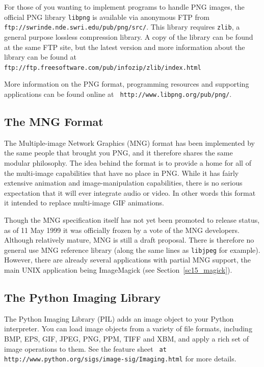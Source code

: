 \documentclass[twoside,11pt]{article}
\newcommand{\htmladdnormallink}[2]{#1}
\newcommand{\htmlref}[2]{#1}
\newcommand{\latex}[1]{#1}
\newcommand{\xlabel}[1]{}
\begin{document}
For those of you wanting to implement programs to handle PNG images,
the official PNG library {\tt libpng} is available via anonymous FTP
from \htmladdnormallink{{\tt
ftp://swrinde.nde.swri.edu/pub/png/src/}}{ftp://swrinde.nde.swri.edu/pub/png/src/}.
This library requires {\tt zlib}, a general purpose lossless
compression library. A copy of the library can be found at the same
FTP site, but the latest version and more information about the
library can be found at \htmladdnormallink{{\tt
ftp://ftp.freesoftware.com/pub/infozip/zlib/index.html}}{ftp://ftp.freesoftware.com/pub/infozip/zlib/index.html}

More information on the PNG format, programming resources and
supporting applications can be found online at \htmladdnormallink{{\tt
http://www.libpng.org/pub/png/}}{http://www.libpng.org/pub/png/}.

\subsection{\xlabel{sc15_mng}The MNG Format\label{sc15_mng}}

The \htmladdnormallink{Multiple-image Network
Graphics}{http://www.libpng.org/pub/mng/} (MNG) format has been
implemented by the same people that brought you PNG, and it therefore
shares the same modular philosophy. The idea behind the format is to
provide a home for all of the multi-image capabilities that have no
place in PNG. While it has fairly extensive animation and
image-manipulation capabilities, there is no serious expectation that
it will ever integrate audio or video. In other words this format it
intended to replace multi-image GIF animations.

Though the MNG specification itself has not yet been promoted to
release status, as of 11 May 1999 it was officially frozen by a vote
of the MNG developers. Although relatively mature, MNG is still a
draft proposal. There is therefore no general use MNG reference
library (along the same lines as {\tt libjpeg} for example). However,
there are already several applications with partial MNG support, the
main UNIX application being \htmlref{ImageMagick}{sc15_magick}\latex{
(see Section~\ref{sc15_magick})}.

\subsection{\xlabel{sc15_pythonimg}The Python Imaging Library\label{sc15_pythonimg}}

The \htmladdnormallink{Python Imaging
Library}{http://www.python.org/sigs/image-sig/Imaging.html} (PIL) adds
an image object to your Python interpreter. You can load image objects
from a variety of file formats, including BMP, EPS, GIF, JPEG, PNG,
PPM, TIFF and XBM, and apply a rich set of image operations to them.
See the \htmladdnormallink{feature
sheet}{http://www.python.org/sigs/image-sig/Features.html} \latex{{\tt
at http://www.python.org/sigs/image-sig/Imaging.html}} for more
details.
\end{document}
